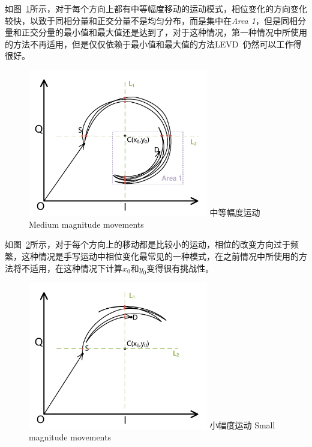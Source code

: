 如图~\ref{fig:medium-magnitude-movements}所示，对于每个方向上都有中等幅度移动的运动模式，相位变化的方向变化较快，以致于同相分量和正交分量不是均匀分布，而是集中在\textit{Area 1}，但是同相分量和正交分量的最小值和最大值还是达到了，对于这种情况，第一种情况中所使用的方法不再适用，但是仅仅依赖于最小值和最大值的方法LEVD~\cite{wang2016device}仍然可以工作得很好。
\begin{figure}[!htp]
  \centering
  \includegraphics[width=0.7\textwidth]{figure/medium-magnitude-movement.pdf}
  \bicaption
    {中等幅度运动}
    {Medium magnitude movements}
  \label{fig:medium-magnitude-movements}
\end{figure}

如图~\ref{fig:small-magnitude-movements}所示，对于每个方向上的移动都是比较小的运动，相位的改变方向过于频繁，这种情况是手写运动中相位变化最常见的一种模式，在之前情况中所使用的方法将不适用，在这种情况下计算$x_{0}$和$y_{0}$变得很有挑战性。
\begin{figure}[!htp]
  \centering
  \includegraphics[width=0.7\textwidth]{figure/small-magnitude-movement.pdf}
  \bicaption
    {小幅度运动}
    {Small magnitude movements}
  \label{fig:small-magnitude-movements}
\end{figure}

